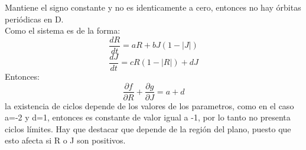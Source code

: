 \documentclass[a4paper, 10pt]{article}
\begin{document}
 Mantiene el signo constante y no es identicamente a cero, entonces no hay órbitas periódicas en D.
 \\ Como el sistema es de la forma:
$$\frac{dR}{dt}=aR+bJ(1-|J|) $$
$$\frac{dJ}{dt}=cR(1-|R|)+dJ$$
 Entonces:
  $$ \frac{\partial f}{\partial R} + \frac{\partial g}{ \partial J} =  a + d$$
  la existencia de ciclos depende de los valores de los parametros, como en el caso a=-2 y d=1, entonces es
  constante de valor igual a -1, por lo tanto no presenta ciclos límites. Hay que destacar que depende
   de la región del plano, puesto que esto afecta si R o J son positivos.
\end{document}
